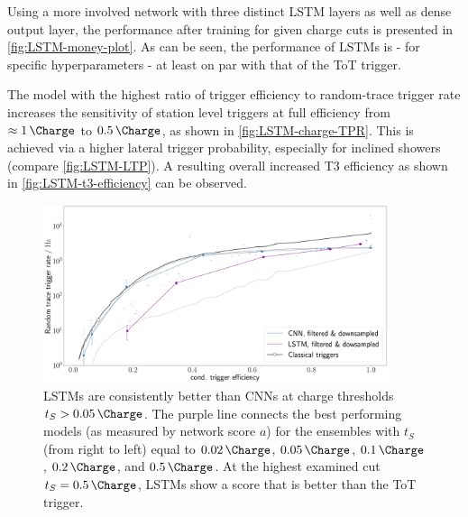 Using a more involved network with three distinct LSTM layers as well as dense output layer, the performance after training for given charge cuts is presented in
\autoref{fig:LSTM-money-plot}. As can be seen, the performance of LSTMs is - for specific hyperparameters - at least on par with that of the ToT trigger.

The model with the highest ratio of trigger efficiency to random-trace trigger rate increases the sensitivity of station level triggers at full efficiency from 
$\approx\SI{1}{\Charge}$ to $\SI{0.5}{\Charge}$, as shown in \autoref{fig:LSTM-charge-TPR}. This is achieved via a higher lateral trigger probability, especially
for inclined showers (compare \autoref{fig:LSTM-LTP}). A resulting overall increased T3 efficiency as shown in \autoref{fig:LSTM-t3-efficiency} can be observed.

\begin{figure}
	\centering
	\includegraphics[width=0.9\textwidth]{./plots/LSTM_money_plot.png}
	\caption{LSTMs are consistently better than CNNs at charge thresholds $t_S > \SI{0.05}{\Charge}$. The purple line connects the best performing models (as 
	measured by network score $a$) for the ensembles with $t_S$ (from right to left) equal to $\SI{0.02}{\Charge}$, $\SI{0.05}{\Charge}$, $\SI{0.1}{\Charge}$,
	$\SI{0.2}{\Charge}$, and $\SI{0.5}{\Charge}$. At the highest examined cut $t_S = \SI{0.5}{\Charge}$, LSTMs show a score that is better than the ToT trigger.}
	\label{fig:LSTM-money-plot}
\end{figure}

